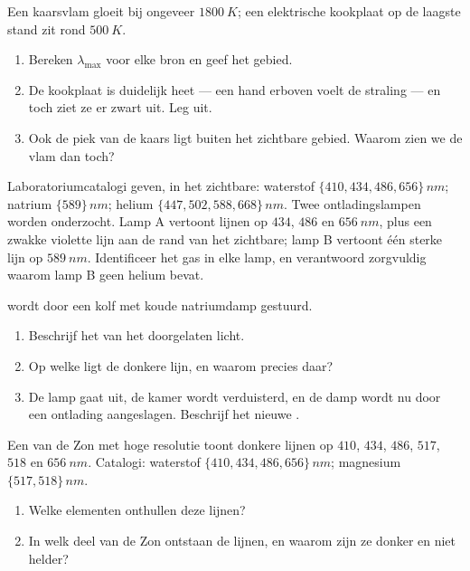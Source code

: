 \begin{exercise}[$\star\star$]\label{exo:g10:light-spectra:7}
Een kaarsvlam gloeit bij ongeveer $\qty{1800}{K}$; een elektrische
kookplaat op de laagste stand zit rond $\qty{500}{K}$.
\begin{enumerate}
  \item Bereken $\lambda_{\max}$ voor elke bron en geef het gebied.
  \item De kookplaat is duidelijk heet --- een hand erboven voelt de
        straling --- en toch ziet ze er zwart uit. Leg uit.
  \item Ook de piek van de kaars ligt buiten het zichtbare gebied.
        Waarom zien we de vlam dan toch?
\end{enumerate}
\end{exercise}

\begin{exercise}[$\star\star$]\label{exo:g10:light-spectra:8}
Laboratoriumcatalogi geven, in het zichtbare: waterstof
$\{410, 434, 486, 656\}\,\unit{nm}$; natrium $\{589\}\,\unit{nm}$; helium
$\{447, 502, 588, 668\}\,\unit{nm}$. Twee ontladingslampen worden
onderzocht. Lamp A vertoont lijnen op $434$, $486$ en $\qty{656}{nm}$,
plus een zwakke violette lijn aan de rand van het zichtbare; lamp B
vertoont één sterke lijn op $\qty{589}{nm}$. Identificeer het gas in elke
lamp, en verantwoord zorgvuldig waarom lamp B geen helium bevat.
\end{exercise}

\begin{exercise}[$\star\star$]\label{exo:g10:light-spectra:9}
 wordt door een kolf met koude natriumdamp gestuurd.
\begin{enumerate}
  \item Beschrijf het  van het doorgelaten licht.
  \item Op welke  ligt de donkere lijn, en waarom precies
        daar?
  \item De lamp gaat uit, de kamer wordt verduisterd, en de damp wordt nu
        door een ontlading aangeslagen. Beschrijf het nieuwe .
\end{enumerate}
\end{exercise}

\begin{exercise}[$\star\star$]\label{exo:g10:light-spectra:10}
Een  van de Zon met hoge resolutie toont donkere lijnen op $410$,
$434$, $486$, $517$, $518$ en $\qty{656}{nm}$. Catalogi: waterstof
$\{410, 434, 486, 656\}\,\unit{nm}$; magnesium $\{517, 518\}\,\unit{nm}$.
\begin{enumerate}
  \item Welke elementen onthullen deze lijnen?
  \item In welk deel van de Zon ontstaan de lijnen, en waarom zijn ze
        donker en niet helder?
\end{enumerate}
\end{exercise}

